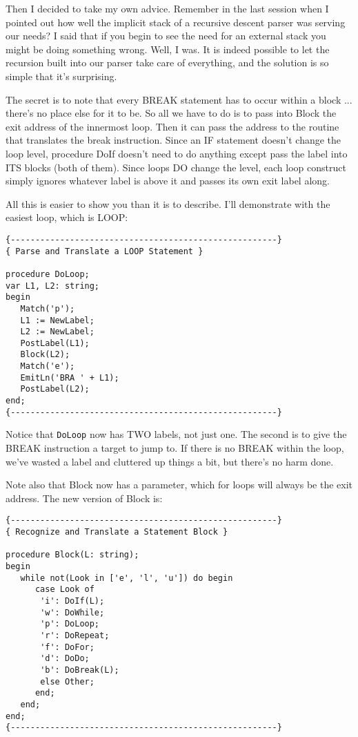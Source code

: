 Then  I  decided  to take my own advice. Remember  in  the  last session when  I  pointed  out  how  well  the implicit stack of a recursive descent parser was  serving  our needs?  I said that if you begin to  see  the  need  for  an external stack you might be doing  something  wrong. Well, I was. It is indeed possible to let the recursion built into  our parser take care of everything, and the solution is so simple that it's surprising.

The secret is  to  note  that  every BREAK statement has to occur within a block ... there's no place else for it to be. So all we have  to  do  is to pass into  Block  the  exit  address  of  the innermost loop. Then it can pass the address to the routine that translates the  break instruction. Since an IF statement doesn't change the loop level, procedure DoIf doesn't need to do anything except  pass the label into ITS blocks (both  of  them). Since loops DO change the level, each  loop  construct  simply ignores whatever label is above it and passes its own exit label along.

All  this  is easier to show you than it is to  describe. I'll demonstrate with the easiest loop, which is LOOP:

\begin{verbatim}
{------------------------------------------------------}
{ Parse and Translate a LOOP Statement }

procedure DoLoop;
var L1, L2: string;
begin
   Match('p');
   L1 := NewLabel;
   L2 := NewLabel;
   PostLabel(L1);
   Block(L2);
   Match('e');
   EmitLn('BRA ' + L1);
   PostLabel(L2);
end;
{------------------------------------------------------}
\end{verbatim}

Notice that {\tt DoLoop} now has TWO labels, not just one. The second is to give the BREAK instruction a target to jump  to. If there is no BREAK within  the  loop, we've wasted a label and cluttered up things a bit, but there's no harm done.

Note also that Block now has a parameter, which  for  loops  will always be the exit address. The new version of Block is:

\begin{verbatim}
{------------------------------------------------------}
{ Recognize and Translate a Statement Block }

procedure Block(L: string);
begin
   while not(Look in ['e', 'l', 'u']) do begin
      case Look of
       'i': DoIf(L);
       'w': DoWhile;
       'p': DoLoop;
       'r': DoRepeat;
       'f': DoFor;
       'd': DoDo;
       'b': DoBreak(L);
       else Other;
      end;
   end;
end;
{------------------------------------------------------}
\end{verbatim}

